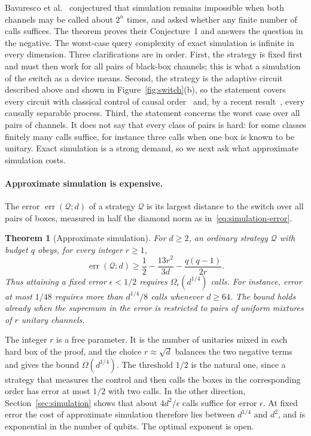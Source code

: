 \documentclass[11pt,letterpaper]{article}
\newtheorem{theorem}{Theorem}
\theoremstyle{definition}\newtheorem{definition}[theorem]{Definition}
\newcommand{\QC}{\mathcal Q}
\newcommand{\reffig}[1]{Figure~\ref{#1}}
\begin{document}
Bavaresco et al.~\cite{bavaresco2025} conjectured that simulation
remains impossible when both channels may be called about $2^n$ times,
and asked whether any finite number of calls suffices. The theorem
proves their Conjecture~1 and answers the question in the negative. The
worst-case query complexity of exact simulation is infinite in every
dimension. Three
clarifications are in order. First, the strategy is fixed first and
must then work for all pairs of black-box channels; this is what a
simulation of the switch as a device means. Second, the strategy is the
adaptive circuit described above and shown in \reffig{fig:switch}(b),
so the statement covers every circuit with classical control of causal
order~\cite{wechs2021} and, by a recent result~\cite{wechs2026}, every
causally separable process. Third, the statement concerns the worst
case over all pairs of channels. It does not say that every class of
pairs is hard: for some classes finitely many calls suffice, for
instance three calls when one box is known to be unitary. Exact simulation is a strong demand, so we next ask what
approximate simulation costs.

\paragraph{Approximate simulation is expensive.}
The error $\operatorname{err}(\QC;d)$ of a strategy $\QC$ is its
largest distance to the switch over all pairs of boxes, measured in
half the diamond norm as in~\eqref{eq:simulation-error}.

\begin{theorem}[Approximate simulation]\label{thm:simulation-summary}
For $d\ge2$, an ordinary strategy $\QC$ with budget $q$ obeys, for every
integer $r\ge1$,
\begin{equation}\label{eq:tradeoff-intro}
 \operatorname{err}(\QC;d)\ge
 \frac12-\frac{13r^2}{3d}-\frac{q(q-1)}{2r}.
\end{equation}
Thus attaining a fixed error $\epsilon<1/2$ requires
$\Omega_\epsilon(d^{1/4})$ calls. For instance, error at most $1/48$
requires more than $d^{1/4}/8$ calls whenever $d\ge64$. The bound holds
already when the supremum in the error is restricted to pairs of uniform
mixtures of $r$ unitary channels.
\end{theorem}

The integer $r$ is a free parameter. It is the number of unitaries
mixed in each hard box of the proof, and the choice $r\approx\sqrt d$
balances the two negative terms and gives the bound $\Omega(d^{1/4})$.
The threshold $1/2$ is the natural one, since a strategy that measures
the control and then calls the boxes in the corresponding order has
error at most $1/2$ with two calls. In the other direction,
Section~\ref{sec:simulation} shows that about $4d^2/\epsilon$ calls
suffice for error $\epsilon$. At fixed error the cost of approximate
simulation therefore lies between $d^{1/4}$ and $d^2$, and is
exponential in the number of qubits. The optimal exponent is open.
\end{document}
